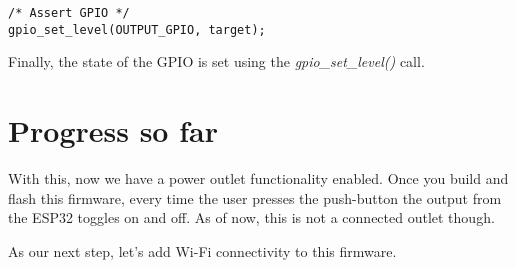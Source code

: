 \documentclass[main.tex]{subfiles}
\begin{document}
\begin{verbatim}
/* Assert GPIO */
gpio_set_level(OUTPUT_GPIO, target);

\end{verbatim}

Finally, the state of the GPIO is set using the \textit{gpio\_set\_level()} call.

\section{Progress so far}
With this, now we have a power outlet functionality enabled. Once you build and flash this firmware, every time the user presses the push-button the output from the ESP32 toggles on and off. As of now, this is not a connected outlet though. 

As our next step, let's add Wi-Fi connectivity to this firmware.
\end{document}
